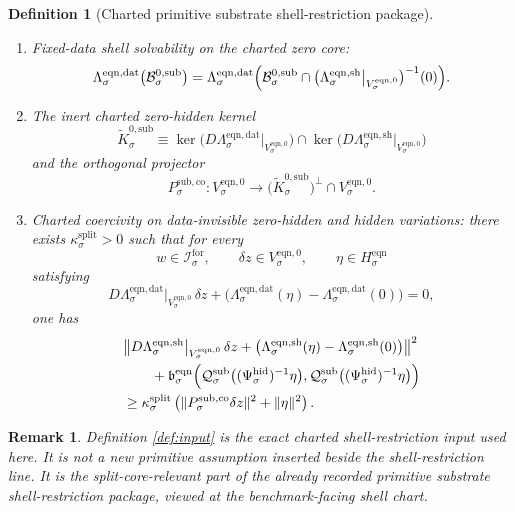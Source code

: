 \documentclass[11pt]{article}
\newcommand{\ForSpace}[1]{\mathcal I_{#1}^{\mathrm{for}}}
\newcommand{\EqnZero}[1]{V_{#1}^{\mathrm{eqn},0}}
\newcommand{\EqnHidden}[1]{H_{#1}^{\mathrm{eqn}}}
\newcommand{\EqnData}[1]{\Lambda_{#1}^{\mathrm{eqn,dat}}}
\newcommand{\EqnShell}[1]{\Lambda_{#1}^{\mathrm{eqn,sh}}}
\newcommand{\EqnPair}[1]{\mathfrak b_{#1}^{\mathrm{eqn}}}
\newcommand{\HiddenChart}[1]{\Psi_{#1}^{\mathrm{hid}}}
\newcommand{\SubCharge}[1]{\mathcal Q_{#1}^{\mathrm{sub}}}
\newcommand{\SubKernelCh}[1]{\widetilde K_{#1}^{0,\mathrm{sub}}}
\newcommand{\SubStateComp}[1]{P_{#1}^{\mathrm{sub,co}}}
\newcommand{\ZeroBody}[1]{\mathcal B_{#1}^{0,\mathrm{sub}}}
\newtheorem{definition}{Definition}
\newtheorem{remark}{Remark}
\begin{document}
\begin{definition}[Charted primitive substrate shell-restriction package]
\begin{enumerate}
    \item Fixed-data shell solvability on the charted zero core:
    \begin{equation}
    \EqnData{\sigma}\bigl(\ZeroBody{\sigma}\bigr)
    =
    \EqnData{\sigma}\Bigl(
    \ZeroBody{\sigma}\cap
    \bigl(\EqnShell{\sigma}\big|_{\EqnZero{\sigma}}\bigr)^{-1}(0)
    \Bigr).
    \label{eq:solvability}
    \end{equation}
    \item The inert charted zero-hidden kernel
    \[
    \SubKernelCh{\sigma}
    \equiv
    \ker\bigl(D\EqnData{\sigma}\big|_{\EqnZero{\sigma}}\bigr)
    \cap
    \ker\bigl(D\EqnShell{\sigma}\big|_{\EqnZero{\sigma}}\bigr)
    \]
    and the orthogonal projector
    \[
    \SubStateComp{\sigma}:
    \EqnZero{\sigma}\to
    \bigl(\SubKernelCh{\sigma}\bigr)^{\perp}\cap\EqnZero{\sigma}.
    \]
    \item Charted coercivity on data-invisible zero-hidden and hidden variations: there exists \(\kappa_{\sigma}^{\mathrm{split}}>0\) such that for every
    \[
    w\in\ForSpace{\sigma},
    \qquad
    \delta z\in \EqnZero{\sigma},
    \qquad
    \eta\in\EqnHidden{\sigma}
    \]
    satisfying
    \[
    D\EqnData{\sigma}\big|_{\EqnZero{\sigma}}\,\delta z
    +
    \bigl(\EqnData{\sigma}(\eta)-\EqnData{\sigma}(0)\bigr)
    =0,
    \]
    one has
    \begin{equation}
    \begin{aligned}
    &
    \bigl\|
    D\EqnShell{\sigma}\big|_{\EqnZero{\sigma}}\,\delta z
    +
    \bigl(\EqnShell{\sigma}(\eta)-\EqnShell{\sigma}(0)\bigr)
    \bigr\|^{2}
    \\
    &\qquad
    +
    \EqnPair{\sigma}\Bigl(
    \SubCharge{\sigma}\bigl((\HiddenChart{\sigma})^{-1}\eta\bigr),
    \SubCharge{\sigma}\bigl((\HiddenChart{\sigma})^{-1}\eta\bigr)
    \Bigr)
    \\
    &\ge
    \kappa_{\sigma}^{\mathrm{split}}
    \left(
    \|\SubStateComp{\sigma}\delta z\|^{2}
    +
    \|\eta\|^{2}
    \right).
    \end{aligned}
    \label{eq:coercive}
    \end{equation}
\end{enumerate}
\end{definition}

\begin{remark}
Definition \ref{def:input} is the exact charted shell-restriction input used here. It is not a new primitive assumption inserted beside the shell-restriction line. It is the split-core-relevant part of the already recorded primitive substrate shell-restriction package, viewed at the benchmark-facing shell chart.
\end{remark}
\end{document}
